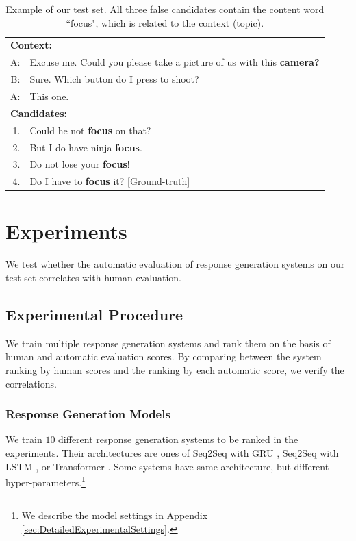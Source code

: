 \documentclass[11pt,a4paper]{article}
\begin{document}
\begin{table}[t]
    \centering
    \small
    \begin{tabular}{rp{40ex}}
        \toprule
        \multicolumn{2}{l}{\textbf{Context:}} \\
        A: & Excuse me. Could you please take a picture of us with this {\bf camera?} \\
        \rule{0pt}{2.5ex}
        B: & Sure. Which button do I press to shoot? \\
        \rule{0pt}{2.5ex}
        A: & This one. \\
        \midrule
        \multicolumn{2}{l}{\textbf{Candidates:}} \\
        1. & Could he not \textbf{focus} on that? \\
        2. & But I do have ninja \textbf{focus}. \\
        3. & Do not lose your \textbf{focus}! \\
        4. & Do I have to \textbf{focus} it? [Ground-truth] \\
        \bottomrule
    \end{tabular}
    \caption{Example of our test set. All three false candidates contain the content word ``focus", which is related to the context (topic). }
    \label{tab:example}
\end{table}


%

\section{Experiments}
We test whether the automatic evaluation of response generation systems on our test set correlates with human evaluation.

\subsection{Experimental Procedure}
\label{subsec:experimentalprocedure}
We train multiple response generation systems and rank them on the basis of human and automatic evaluation scores.
By comparing between the system ranking by human scores and the ranking by each automatic score, we verify the correlations.
\subsubsection{Response Generation Models}

We train $10$ different response generation systems to be ranked in the experiments.
Their architectures are ones of Seq2Seq with GRU \cite{cho-etal-2014-learning}, Seq2Seq with LSTM \cite{lstm}, or Transformer \cite{transformer}.
Some systems have same architecture, but different hyper-parameters.\footnote{We describe the model settings in Appendix \ref{sec:DetailedExperimentalSettings}.}
\end{document}
